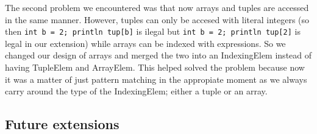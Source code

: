 \documentclass{article}
\begin{document}
The second problem we encountered was that now arrays and tuples are accessed in the same manner. However, tuples can only be accesed with literal integers (so
then \texttt{int b = 2; println tup[b]} is ilegal but \texttt{int b = 2; println tup[2]} is legal in our extension) while arrays can be indexed with expressions. So we changed our design of arrays and merged the two into an IndexingElem instead of having TupleElem and ArrayElem. This helped solved the problem because now it was a matter of just pattern matching in the appropiate moment as we always carry around the type of the IndexingElem; either a tuple or an array.

\subsection{Future extensions}
\end{document}
